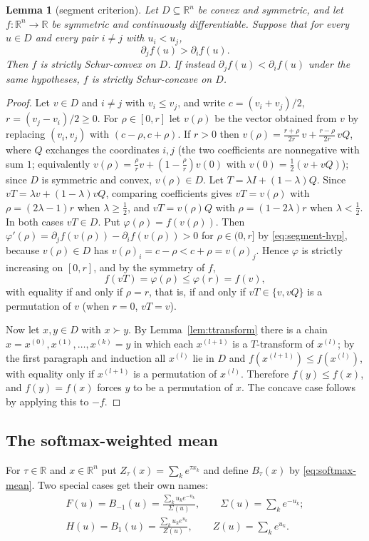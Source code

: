 \documentclass[11pt,a4paper]{article}
\theoremstyle{plain}
\newtheorem{lemma}[theorem]{Lemma}
\theoremstyle{definition}
\newcommand{\R}{\mathbb{R}}
\newcommand{\maj}{\succ}
\begin{document}
\begin{lemma}[segment criterion]\label{lem:segment}
Let $D\subseteq\R^n$ be convex and symmetric, and let $f\colon\R^n\to\R$ be symmetric and continuously differentiable. Suppose that for every $u\in D$ and every pair $i\ne j$ with $u_i<u_j$,
\begin{equation}\label{eq:segment-hyp}
\partial_j f(u)>\partial_i f(u).
\end{equation}
Then $f$ is strictly Schur-convex on $D$. If instead $\partial_j f(u)<\partial_i f(u)$ under the same hypotheses, $f$ is strictly Schur-concave on $D$.
\end{lemma}

\begin{proof}
Let $v\in D$ and $i\ne j$ with $v_i\le v_j$, and write $c=(v_i+v_j)/2$, $r=(v_j-v_i)/2\ge 0$. For $\rho\in[0,r]$ let $v(\rho)$ be the vector obtained from $v$ by replacing $(v_i,v_j)$ with $(c-\rho,c+\rho)$. If $r>0$ then $v(\rho)=\frac{r+\rho}{2r}\,v+\frac{r-\rho}{2r}\,vQ$, where $Q$ exchanges the coordinates $i,j$ (the two coefficients are nonnegative with sum $1$; equivalently $v(\rho)=\frac{\rho}{r}v+(1-\frac{\rho}{r})v(0)$ with $v(0)=\frac12(v+vQ)$); since $D$ is symmetric and convex, $v(\rho)\in D$. Let $T=\lambda I+(1-\lambda)Q$. Since $vT=\lambda v+(1-\lambda)vQ$, comparing coefficients gives $vT=v(\rho)$ with $\rho=(2\lambda-1)r$ when $\lambda\ge\frac12$, and $vT=v(\rho)Q$ with $\rho=(1-2\lambda)r$ when $\lambda<\frac12$. In both cases $vT\in D$. Put $\varphi(\rho)=f(v(\rho))$. Then $\varphi'(\rho)=\partial_j f(v(\rho))-\partial_i f(v(\rho))>0$ for $\rho\in(0,r]$ by \eqref{eq:segment-hyp}, because $v(\rho)\in D$ has $v(\rho)_i=c-\rho<c+\rho=v(\rho)_j$. Hence $\varphi$ is strictly increasing on $[0,r]$, and by the symmetry of $f$,
\[
f(vT)=\varphi(\rho)\le\varphi(r)=f(v),
\]
with equality if and only if $\rho=r$, that is, if and only if $vT\in\{v,vQ\}$ is a permutation of $v$ (when $r=0$, $vT=v$).

Now let $x,y\in D$ with $x\maj y$. By Lemma~\ref{lem:ttransform} there is a chain $x=x^{(0)},x^{(1)},\dots,x^{(k)}=y$ in which each $x^{(l+1)}$ is a $T$-transform of $x^{(l)}$; by the first paragraph and induction all $x^{(l)}$ lie in $D$ and $f(x^{(l+1)})\le f(x^{(l)})$, with equality only if $x^{(l+1)}$ is a permutation of $x^{(l)}$. Therefore $f(y)\le f(x)$, and $f(y)=f(x)$ forces $y$ to be a permutation of $x$. The concave case follows by applying this to $-f$.
\end{proof}

\subsection{The softmax-weighted mean}
For $\tau\in\R$ and $x\in\R^n$ put $Z_\tau(x)=\sum_k e^{\tau x_k}$ and define $B_\tau(x)$ by \eqref{eq:softmax-mean}. Two special cases get their own names:
\begin{gather*}
F(u)=B_{-1}(u)=\frac{\sum_k u_k e^{-u_k}}{\Sigma(u)},\qquad \Sigma(u)=\sum_k e^{-u_k};\\
H(u)=B_{1}(u)=\frac{\sum_k u_k e^{u_k}}{Z(u)},\qquad Z(u)=\sum_k e^{u_k}.
\end{gather*}
\end{document}

